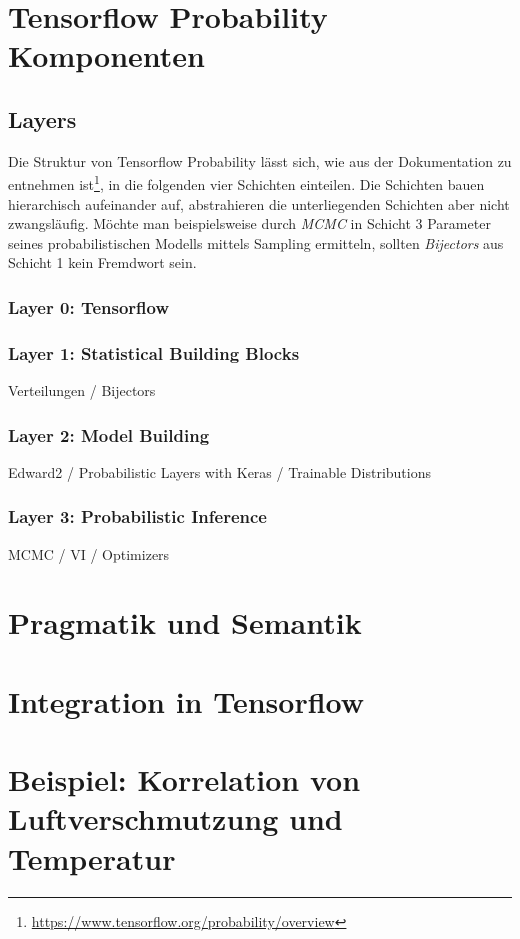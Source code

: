 \documentclass[12pt]{article}
\begin{document}
\section{Tensorflow Probability Komponenten}
\label{sec:tfp-components}

\subsection{Layers}
Die Struktur von Tensorflow Probability lässt sich, wie aus der Dokumentation zu entnehmen ist\footnote{\url{https://www.tensorflow.org/probability/overview}}, in die folgenden vier Schichten einteilen. Die Schichten bauen hierarchisch aufeinander auf, abstrahieren die unterliegenden Schichten aber nicht zwangsläufig. Möchte man beispielsweise durch \textit{MCMC} in Schicht 3 Parameter seines probabilistischen Modells mittels Sampling ermitteln, sollten \textit{Bijectors} aus Schicht 1 kein Fremdwort sein.

\subsubsection{Layer 0: Tensorflow}

\subsubsection{Layer 1: Statistical Building Blocks}
Verteilungen / Bijectors

\subsubsection{Layer 2: Model Building}
Edward2 / Probabilistic Layers with Keras / Trainable Distributions

\subsubsection{Layer 3: Probabilistic Inference}
MCMC / VI / Optimizers

\section{Pragmatik und Semantik}


\section{Integration in Tensorflow}

\section{Beispiel: Korrelation von Luftverschmutzung und Temperatur}
\end{document}
